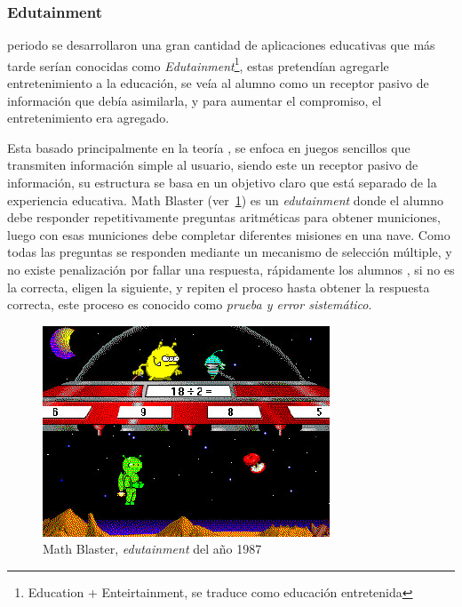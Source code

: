 \subsubsection{Edutainment}

 periodo se desarrollaron una gran cantidad de
aplicaciones educativas que más tarde serían conocidas como
\emph{Edutainment}\footnote{Education + Enteirtainment, se traduce como
    educación entretenida}, estas pretendían agregarle entretenimiento a la
educación, se veía al alumno como un receptor pasivo de información que debía
asimilarla, y para aumentar el compromiso, el entretenimiento era
agregado\cite{resnick:2004}.

Esta basado principalmente en la teoría , se enfoca en juegos
sencillos que transmiten información simple al usuario, siendo este un receptor
pasivo de información, su estructura se basa en un objetivo claro que está
separado de la experiencia educativa\cite{egenfeldt2007third}. Math Blaster
(ver~\ref{fig:math_blaster}) es un \emph{edutainment} donde el alumno debe
responder repetitivamente preguntas aritméticas para obtener municiones, luego
con esas municiones debe completar diferentes misiones en una
nave\cite{bruckman1999can}. Como todas las preguntas se responden mediante un
mecanismo de selección múltiple, y no existe penalización por fallar una
respuesta, rápidamente los alumnos , si no es la correcta, eligen la siguiente, y repiten el proceso
hasta obtener la respuesta correcta, este proceso es conocido como \emph{prueba
    y error sistemático}. 

\begin{figure}[ht!] 
	\centering 
	\includegraphics[scale=0.5,natwidth=296,natheight=217]{tics/math_blaster.jpg}
	\caption{Math Blaster, \emph{edutainment} del año 1987}
	\label{fig:math_blaster} 
\end{figure}


